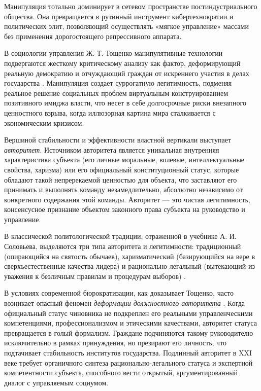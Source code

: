 Манипуляция тотально доминирует в сетевом пространстве постиндустриального общества. Она превращается в рутинный инструмент кибертехнократии и политических элит, позволяющий осуществлять «мягкое управление» массами без применения дорогостоящего репрессивного аппарата. 

В социологии управления Ж. Т. Тощенко манипулятивные технологии подвергаются жесткому критическому анализу как фактор, деформирующий реальную демократию и отчуждающий граждан от искреннего участия в делах государства \cite{Toschenko}. Манипуляция создает суррогатную легитимность, подменяя реальное решение социальных проблем виртуальным конструированием позитивного имиджа власти, что несет в себе долгосрочные риски внезапного ценностного взрыва, когда иллюзорная картина мира сталкивается с экономическим кризисом.

Вершиной стабильности и эффективности властной вертикали выступает \textit{авторитет}. Источником авторитета является уникальная внутренняя характеристика субъекта (его личные моральные, волевые, интеллектуальные свойства, харизма) или его официальный конституционный статус, которые обладают такой непререкаемой ценностью для объекта, что заставляют его принимать и выполнять команду незамедлительно, абсолютно независимо от конкретного содержания этой команды. Авторитет — это чистая легитимность, консенсусное признание объектом законного права субъекта на руководство и управление.

В классической политологической традиции, отраженной в учебнике А. И. Соловьева, выделяются три типа авторитета и легитимности: традиционный (опирающийся на святость обычаев), харизматический (базирующийся на вере в сверхъестественные качества лидера) и рационально-легальный (вытекающий из уважения к безличным правилам и процедурам выборов) \cite{Solovyev}. 

В условиях современной бюрократизации, как доказывает Тощенко, часто возникает опасный феномен \textit{деформации должностного авторитета} \cite{Toschenko}. Когда официальный статус чиновника не подкреплен его реальными управленческими компетенциями, профессионализмом и этическими качествами, авторитет статуса превращается в голый формализм. Граждане подчиняются такому руководителю исключительно в рамках принуждения, но презирают его личность, что подтачивает стабильность институтов государства. Подлинный авторитет в XXI веке требует органичного синтеза рационально-легального статуса и экспертной компетентности субъекта, способного вести открытый, аргументированный диалог с управляемым социумом.